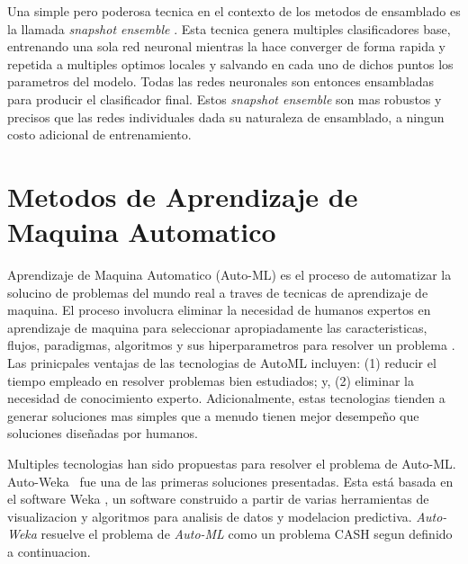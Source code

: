 Una simple pero poderosa tecnica en el contexto de los metodos de ensamblado es la llamada \textit{snapshot ensemble} \parencite{huang17snapshot}. Esta tecnica genera multiples clasificadores base, entrenando una sola red neuronal mientras la hace converger de forma rapida y repetida a multiples optimos locales y salvando en cada uno de dichos puntos los parametros del modelo. Todas las redes neuronales son entonces ensambladas para producir el clasificador final. Estos \textit{snapshot ensemble} son mas robustos y precisos que las redes individuales dada su naturaleza de ensamblado, a ningun costo adicional de entrenamiento.

\section{Metodos de Aprendizaje de Maquina Automatico}\label{section:automl}

Aprendizaje de Maquina Automatico (Auto-ML) es el proceso de automatizar la solucino de problemas del mundo real a traves de tecnicas de aprendizaje de maquina. El proceso involucra eliminar la necesidad de humanos expertos en aprendizaje de maquina para seleccionar apropiadamente las caracteristicas, flujos, paradigmas, algoritmos y sus hiperparametros para resolver un problema \parencite{Dimitrakakis_Liu_Parkes_Radanovic_2019}. Las prinicpales ventajas de las tecnologias de AutoML incluyen: (1) reducir el tiempo empleado en resolver problemas bien estudiados; y, (2) eliminar la necesidad de conocimiento experto. Adicionalmente, estas tecnologias tienden a generar soluciones mas simples que a menudo tienen mejor desempeño que soluciones diseñadas por humanos.

Multiples tecnologias han sido propuestas para resolver el problema de Auto-ML. Auto-Weka~\parencite{autoweka} fue una de las primeras soluciones presentadas. Esta está basada en el software Weka \parencite{weka}, un software construido a partir de varias herramientas de visualizacion y algoritmos para analisis de datos y modelacion predictiva. \textit{Auto-Weka} resuelve el problema de \textit{Auto-ML} como un problema CASH segun definido a continuacion.

